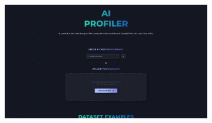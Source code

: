 \bigskip
\begin{figure}[H]
	\centering
	\begin{subfigure}[c]{0.74\textwidth}
			\centering
			\includegraphics[width=\textwidth]{imagenes/home.png}
			\label{fig:casouso_home_escritorio}
	\end{subfigure}
	\hfill
	\begin{subfigure}[c]{0.21\textwidth}
			\centering

\end{subfigure}
\end{figure}
